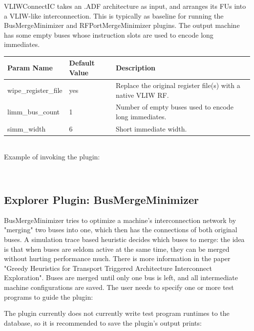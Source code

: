 \documentclass[a4paper,twoside]{tceusermanual}
\begin{document}
VLIWConnectIC takes an .ADF architecture as input, and arranges its FUs into a
VLIW-like interconnection. This is typically as baseline for running the
BusMergeMinimizer and RFPortMergeMinimizer plugins. The output machine has some
empty buses whose instruction slots are used to encode long immediates.

\begin{tabular}{p{}p{}
                p{}}
\textbf{Param Name} &\textbf{Default Value} &\textbf{Description} \\
\hline
wipe\_register\_file & yes & Replace the original register file(s) with a native VLIW RF. \\
limm\_bus\_count & 1 & Number of empty buses used to encode long immediates. \\
simm\_width & 6 & Short immediate width. \\
\end{tabular}\\

Example of invoking the plugin:

\\

\subsection{Explorer Plugin: BusMergeMinimizer}

BusMergeMinimizer tries to optimize a machine's interconnection network by "merging" two buses into one, which then has the connections of both original buses.
A simulation trace based heuristic decides which buses to merge: the idea is that when buses are seldom active at the same time, they can be merged without hurting performance much.
There is more information in the paper "Greedy Heuristics for Transport Triggered Architecture Interconnect Exploration".
Buses are merged until only one bus is left, and all intermediate machine configurations are saved.
The user needs to specify one or more test programs to guide the plugin:


The plugin currently does not currently write test program runtimes to the database, so it is recommended to save the plugin's output prints:

\end{document}
